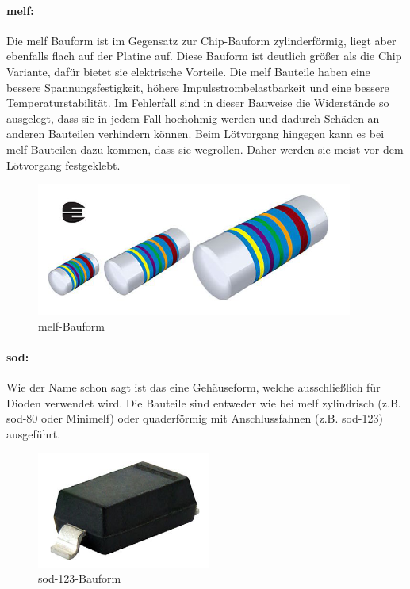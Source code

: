 \paragraph{\ac{melf}:}
Die \ac{melf} Bauform ist im Gegensatz zur Chip-Bauform zylinderförmig, liegt aber ebenfalls flach auf der Platine auf.
Diese Bauform ist deutlich größer als die Chip Variante, dafür bietet sie elektrische Vorteile.
Die \ac{melf} Bauteile haben eine bessere Spannungsfestigkeit, höhere Impulsstrombelastbarkeit und eine bessere Temperaturstabilität.
Im Fehlerfall sind in dieser Bauweise die Widerstände so ausgelegt, dass sie in jedem Fall hochohmig werden und dadurch Schäden an anderen Bauteilen verhindern können.
Beim Lötvorgang hingegen kann es bei \ac{melf} Bauteilen dazu kommen, dass sie wegrollen. Daher werden sie meist vor dem Lötvorgang festgeklebt.
\begin{figure}[htbp!]
	\centering
	\includegraphics{images/technische_grundlagen/melf.png}
	\caption{\ac{melf}-Bauform \cite[vgl.][]{vishay-melf}}
\end{figure}

\paragraph{\ac{sod}:}
Wie der Name schon sagt ist das eine Gehäuseform, welche ausschließlich für Dioden verwendet wird. Die Bauteile sind entweder wie bei \ac{melf} zylindrisch (z.B. \ac{sod}-80 oder Mini\ac{melf}) oder quaderförmig mit Anschlussfahnen (z.B. \ac{sod}-123) ausgeführt.
\begin{figure}[htbp!]
	\centering
	\includegraphics{images/technische_grundlagen/sod-123.png}
	\caption{\ac{sod}-123-Bauform \cite[vgl.][]{vishay-sod-123}}
\end{figure}


